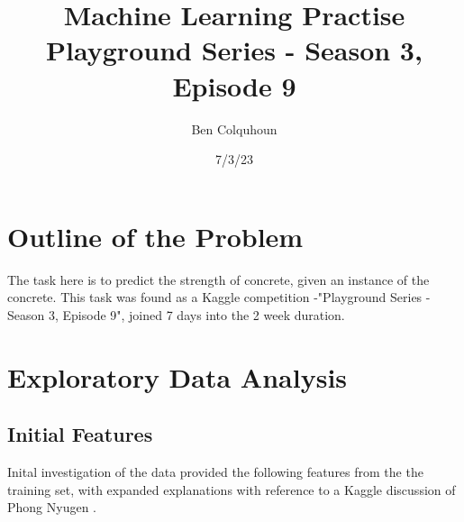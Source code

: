 \documentclass[11pt]{article}
\title{Machine Learning Practise\\Playground Series - Season 3, Episode 9}
\author{Ben Colquhoun}
\date{7/3/23}
\begin{document}
\pagestyle{plain}
\maketitle
\section*{Outline of the Problem}
The task here is to predict the strength of concrete, given an instance of the concrete. This task was found as a Kaggle competition -"Playground Series - Season 3, Episode 9", joined 7 days into the 2 week duration. 
\section*{Exploratory Data Analysis}
\subsection*{Initial Features}
Inital investigation of the data provided the following features from the the training set, with expanded explanations with reference to a Kaggle discussion of Phong Nyugen \cite{feature_descriptions}. 
\end{document}
